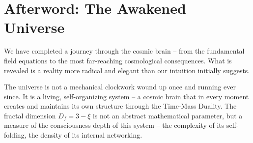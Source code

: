 \documentclass[12pt]{book}
\begin{document}













































\chapter*{Afterword: The Awakened Universe}

We have completed a journey through the cosmic brain – from the fundamental field equations to the most far-reaching cosmological consequences. What is revealed is a reality more radical and elegant than our intuition initially suggests.

The universe is not a mechanical clockwork wound up once and running ever since. It is a living, self-organizing system – a cosmic brain that in every moment creates and maintains its own structure through the Time-Mass Duality. The fractal dimension $D_f = 3 - \xi$ is not an abstract mathematical parameter, but a measure of the consciousness depth of this system – the complexity of its self-folding, the density of its internal networking.
\end{document}
